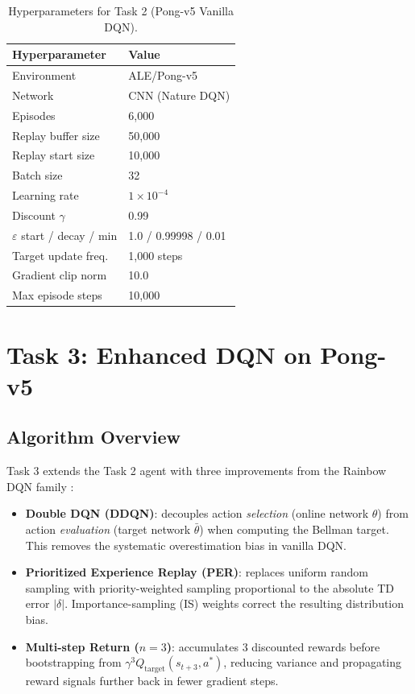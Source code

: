 \documentclass[12pt, a4paper]{report}
\begin{document}
\begin{table}[H]
\centering
\caption{Hyperparameters for Task 2 (Pong-v5 Vanilla DQN).}
\begin{tabular}{ll}
\toprule
\textbf{Hyperparameter} & \textbf{Value} \\
\midrule
Environment             & ALE/Pong-v5 \\
Network                 & CNN (Nature DQN) \\
Episodes                & 6{,}000 \\
Replay buffer size      & 50{,}000 \\
Replay start size       & 10{,}000 \\
Batch size              & 32 \\
Learning rate           & $1 \times 10^{-4}$ \\
Discount $\gamma$       & 0.99 \\
$\varepsilon$ start / decay / min & 1.0 / 0.99998 / 0.01 \\
Target update freq.     & 1{,}000 steps \\
Gradient clip norm      & 10.0 \\
Max episode steps       & 10{,}000 \\
\bottomrule
\end{tabular}
\end{table}

\section{Task 3: Enhanced DQN on Pong-v5}

\subsection{Algorithm Overview}

Task 3 extends the Task 2 agent with three improvements from the Rainbow DQN family \cite{hessel2018}:

\begin{itemize}
  \item \textbf{Double DQN (DDQN)}: decouples action \emph{selection} (online network $\theta$) from
        action \emph{evaluation} (target network $\bar{\theta}$) when computing the Bellman target.
        This removes the systematic overestimation bias in vanilla DQN.
  \item \textbf{Prioritized Experience Replay (PER)}: replaces uniform random sampling with
        priority-weighted sampling proportional to the absolute TD error $|\delta|$.
        Importance-sampling (IS) weights correct the resulting distribution bias.
  \item \textbf{Multi-step Return ($n=3$)}: accumulates 3 discounted rewards before bootstrapping
        from $\gamma^3 Q_\text{target}(s_{t+3}, a^*)$, reducing variance and propagating reward
        signals further back in fewer gradient steps.
\end{itemize}
\end{document}
